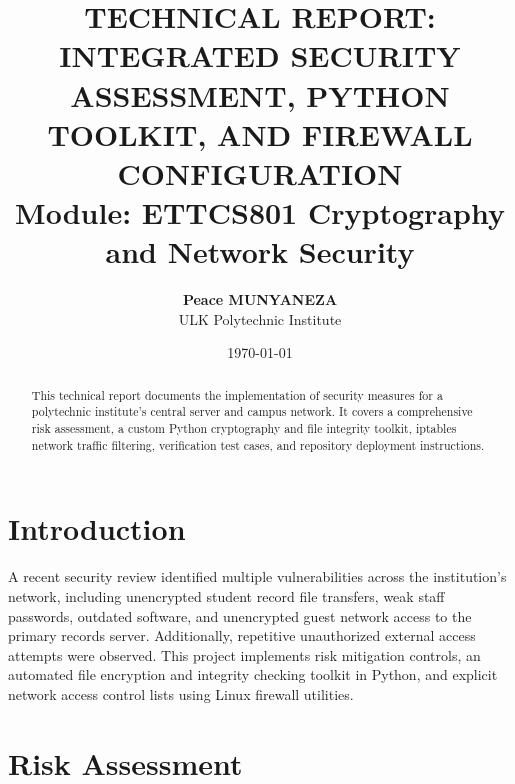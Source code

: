 \documentclass[12pt,a4paper]{article}
\title{\textbf{TECHNICAL REPORT: INTEGRATED SECURITY ASSESSMENT, PYTHON TOOLKIT, AND FIREWALL CONFIGURATION}\\
\large Module: ETTCS801 Cryptography and Network Security}
\author{\textbf{Peace MUNYANEZA}\\ULK Polytechnic Institute}
\date{\today}
\begin{document}
\maketitle

\begin{abstract}
This technical report documents the implementation of security measures for a polytechnic institute's central server and campus network. It covers a comprehensive risk assessment, a custom Python cryptography and file integrity toolkit, iptables network traffic filtering, verification test cases, and repository deployment instructions.
\end{abstract}

\tableofcontents
\newpage

\section{Introduction}
A recent security review identified multiple vulnerabilities across the institution's network, including unencrypted student record file transfers, weak staff passwords, outdated software, and unencrypted guest network access to the primary records server. Additionally, repetitive unauthorized external access attempts were observed. This project implements risk mitigation controls, an automated file encryption and integrity checking toolkit in Python, and explicit network access control lists using Linux firewall utilities.

\section{Risk Assessment}
\end{document}
